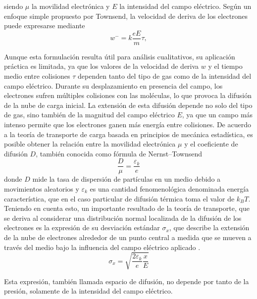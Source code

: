 \documentclass{article}
\begin{document}
\noindent siendo $\mu$ la movilidad electrónica y $E$ la intensidad del campo eléctrico. Según un enfoque simple propuesto por Townsend\cite{townsend1901xvii}, la velocidad de deriva de los electrones puede expresarse mediante 
\begin{equation}
    w^{-}=k \frac{e E}{m} \tau,
\end{equation}

\noindent Aunque esta formulación resulta útil para análisis cualitativos, su aplicación práctica es limitada, ya que los valores de la velocidad de deriva $w$ y el tiempo medio entre colisiones $\tau$ dependen tanto del tipo de gas como de la intensidad del campo eléctrico. Durante su desplazamiento en presencia del campo, los electrones sufren múltiples colisiones con las moléculas, lo que provoca la difusión de la nube de carga inicial. La extensión de esta difusión depende no solo del tipo de gas, sino también de la magnitud del campo eléctrico $E$, ya que un campo más intenso permite que los electrones ganen más energía entre colisiones. De acuerdo a la teoría de transporte de carga basada en principios de mecánica estadística, es posible obtener la relación entre la movilidad electrónica $\mu$ y el coeficiente de difusión $D$, también conocida como fórmula de Nernst–Townsend \cite{loeb1947mechanism}
\begin{equation}
    \frac{D}{\mu}=\frac{\varepsilon_k}{e}
\end{equation}
\noindent donde $D$ mide la tasa de dispersión de partículas en un medio debido a movimientos aleatorios y $\varepsilon_k$ es una cantidad fenomenológica denominada energía característica, que en el caso particular de difusión térmica toma el valor de $k_{B} T$.\\

\noindent Teniendo en cuenta esto, un importante resultado de la teoría de transporte, que se deriva al considerar una distribución normal localizada de la difusión de los electrones es la expresión de su desviación estándar $\sigma_x$, que describe la extensión de la nube de electrones alrededor de un punto central a medida que se mueven a través del medio bajo la influencia del campo eléctrico aplicado \cite{sauli2015gaseous2}.
\begin{equation}
    \sigma_x=\sqrt{\frac{2 \varepsilon_k}{e} \frac{x}{E}}
\end{equation}

\noindent Esta expresión, también llamada espacio de difusión, no depende por tanto de la presión, solamente de la intensidad del campo eléctrico.\\
\end{document}
